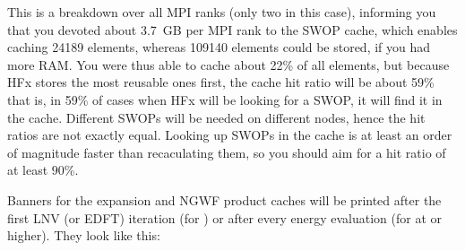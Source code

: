 \documentclass[letterpaper,10pt,english]{sphinxmanual}
\begin{document}
\begin{sphinxVerbatim}[commandchars=\\\{\}]
\end{sphinxVerbatim}

This is a breakdown over all MPI ranks (only two in this case),
informing you that you devoted about 3.7 GB per MPI rank to the SWOP
cache, which enables caching 24189 elements, whereas 109140 elements
could be stored, if you had more RAM. You were thus able to cache about
22\% of all elements, but because HFx stores the most reusable ones
first, the cache hit ratio will be about 59\% \textendash{} that is, in 59\% of cases
when HFx will be looking for a SWOP, it will find it in the cache.
Different SWOPs will be needed on different nodes, hence the hit ratios
are not exactly equal. Looking up SWOPs in the cache is at least an
order of magnitude faster than recaculating them, so you should aim for
a hit ratio of at least \(90\)\%.

Banners for the expansion and NGWF product caches will be printed after
the first LNV (or EDFT) iteration (for ) or
after every energy evaluation (for  at 
or higher). They look like this:
\end{document}
